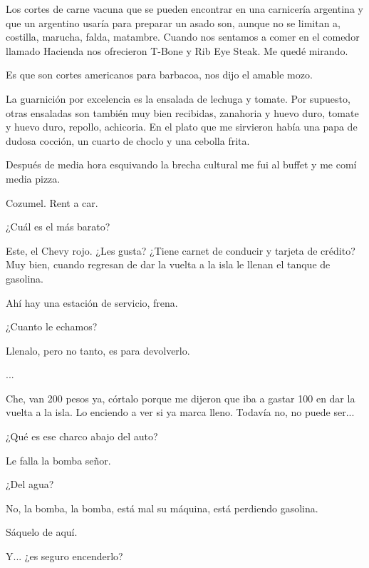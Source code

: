 \documentclass[11pt,twoside,openright,a6paper]{book}
\begin{document}
\vspace{0.5cm}

Los cortes de carne vacuna que se pueden encontrar en una carnicería argentina y que un argentino usaría para preparar un asado son, aunque no se limitan a, costilla, marucha, falda, matambre. Cuando nos sentamos a comer en el comedor llamado Hacienda nos ofrecieron T-Bone y Rib Eye Steak. Me quedé mirando.

Es que son cortes americanos para barbacoa, nos dijo el amable mozo.

La guarnición por excelencia es la ensalada de lechuga y tomate. Por supuesto, otras ensaladas son también muy bien recibidas, zanahoria y huevo duro, tomate y huevo duro, repollo, achicoria. En el plato que me sirvieron había una papa de dudosa cocción, un cuarto de choclo y una cebolla frita.

Después de media hora esquivando la brecha cultural me fui al buffet y me comí media pizza.

\vspace{0.5cm}

Cozumel. Rent a car.

¿Cuál es el más barato?

Este, el Chevy rojo. ¿Les gusta? ¿Tiene carnet de conducir y tarjeta de crédito? Muy bien, cuando regresan de dar la vuelta a la isla le llenan el tanque de gasolina.

\vspace{0.5cm}

Ahí hay una estación de servicio, frena.

¿Cuanto le echamos?

Llenalo, pero no tanto, es para devolverlo.

...

Che, van 200 pesos ya, córtalo porque me dijeron que iba a gastar 100 en dar la vuelta a la isla. Lo enciendo a ver si ya marca lleno. Todavía no, no puede ser...

\vspace{0.5cm}

¿Qué es ese charco abajo del auto?

Le falla la bomba señor.

¿Del agua?

No, la bomba, la bomba, está mal su máquina, está perdiendo gasolina.

\vspace{0.5cm}

Sáquelo de aquí.

Y... ¿es seguro encenderlo?
\end{document}
